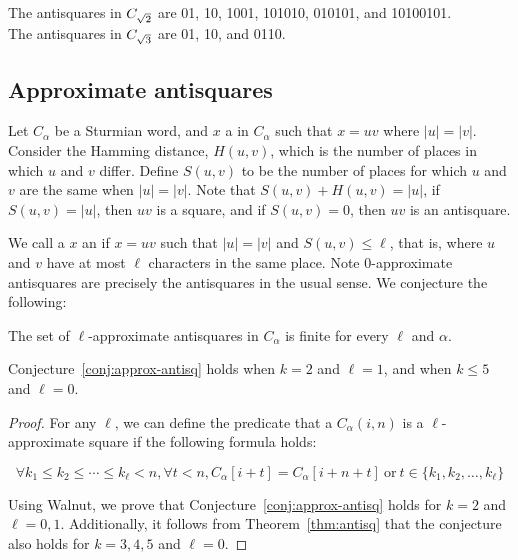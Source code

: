 \begin{example}
The antisquares in $C_{\sqrt{2}}$ are 01, 10, 1001, 101010, 010101, and 10100101.\\
The antisquares in $C_{\sqrt{3}}$ are 01, 10, and 0110.
\end{example}

\subsection{Approximate antisquares}

Let $C_{\alpha}$ be a Sturmian word, and $x$ a \factor in $C_{\alpha}$ such that $x=uv$ where $|u| = |v|$.
Consider the Hamming distance, $H(u,v)$, which is the number of places in which $u$ and $v$ differ.
Define $S(u,v)$ to be the number of places for which $u$ and $v$ are the same when $|u| = |v|$.
Note that $S(u,v) + H(u,v) = |u|$, if $S(u,v) = |u|$, then $uv$ is a square, and if $S(u,v) = 0$, then $uv$ is an antisquare.

We call a \word $x$ an  if $x = uv$ such that $|u| = |v|$ and $S(u,v) \leq \ell$, that is, where $u$ and $v$ have at most $\ell$ characters in the same place.
Note $0$-approximate antisquares are precisely the antisquares in the usual sense.
We conjecture the following:

\begin{conjecture}\label{conj:approx-antisq}
    The set of $\ell$-approximate antisquares in $C_{\alpha}$ is finite for every $\ell$ and $\alpha$.
\end{conjecture}

\begin{theorem}\label{thm:approx-antisq}
Conjecture~\ref{conj:approx-antisq} holds when $k = 2$ and $\ell = 1$, and when $k \leq 5$ and $\ell = 0$.
\end{theorem}
\begin{proof}
For any $\ell$, we can define the predicate that a \factor $C_{\alpha}(i,n)$ is a $\ell$-approximate square if the following formula holds:

\begin{equation*}
    \forall k_1 \leq k_2 \leq \cdots \leq k_{\ell} < n, \forall t < n, C_{\alpha}[i + t] = C_{\alpha}[i + n + t] ~ \text{or} ~ t \in \{ k_1, k_2, \ldots, k_{\ell} \}
\end{equation*}

Using Walnut, we prove that Conjecture~\ref{conj:approx-antisq} holds for $k=2$ and $\ell = 0, 1$.
Additionally, it follows from Theorem~\ref{thm:antisq} that the conjecture also holds for $k=3,4,5$ and $\ell = 0$.
\end{proof}

